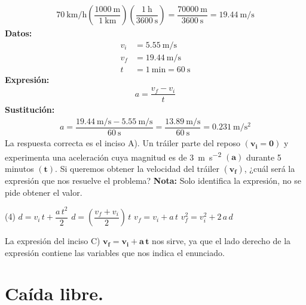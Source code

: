 \documentclass[12pt, letter]{exam}
\begin{document}
\begin{questions}
\begin{align*}
    \SI[per-mode=fraction]{70}{\kilo\meter\per\hour} \left( \dfrac{\SI{1000}{\meter}}{\SI{1}{\kilo\meter}} \right) \left( \dfrac{\SI{1}{\hour}}{\SI{3600}{\second}} \right) = \dfrac{\SI{70000}{\meter}}{\SI{3600}{\second}} = \SI[per-mode=fraction]{19.44}{\meter\per\second}
    \end{align*}
    \textbf{Datos:}
    \begin{align*}
    v_{i} &= \SI[per-mode=fraction]{5.55}{\meter\per\second} \\[0.5em]
    v_{f} &= \SI[per-mode=fraction]{19.44}{\meter\per\second} \\[0.5em]
    t &= \SI{1}{\minute} = \SI{60}{\second}
    \end{align*}
    \textbf{Expresión:}
    \begin{align*}
    a = \dfrac{v_{f} - v_{i}}{t}
    \end{align*}
    \textbf{Sustitución:}
    \begin{align*}
    a = \dfrac{\displaystyle \SI[per-mode=fraction]{19.44}{\meter\per\second} - \SI[per-mode=fraction]{5.55}{\meter\per\second}}{\SI{60}{\second}} = \dfrac{\displaystyle \SI[per-mode=fraction]{13.89}{\meter\per\second}}{\SI{60}{\second}} = \SI[per-mode=fraction]{0.231}{\meter\per\square\second}
    \end{align*}
    La respuesta correcta es el inciso A).
    \question Un tráiler parte del reposo $\mathbf{(v_{i} = 0)}$ y experimenta una aceleración cuya magnitud es de \SI{3}{\meter\per\square\second} $\mathbf{(a)}$ durante \num{5} minutos $\mathbf{(t)}$. Si queremos obtener la velocidad del tráiler $\mathbf{(v_{f})}$, ¿cuál será la expresión que nos resuelve el problema? \textbf{Nota: } Solo identifica la expresión, no se pide obtener el valor.
    \begin{tasks}(4)
        \task $d = v_{i} \, t + \dfrac{a \, t^{2}}{2}$
        \task $d = \left( \dfrac{v_{f} + v_{i}}{2} \right) \, t$
        \task $v_{f} = v_{i} + a \, t$
        \task $v_{f}^{2} = v_{i}^{2} + 2\, a \, d$
    \end{tasks}
    La expresión del inciso C) $\mathbf{v_{f} = v_{i} + a \, t}$ nos sirve, ya que el lado derecho de la expresión contiene las variables que nos indica el enunciado.
    
    \section{Caída libre.}
    

\end{questions}
\end{document}
